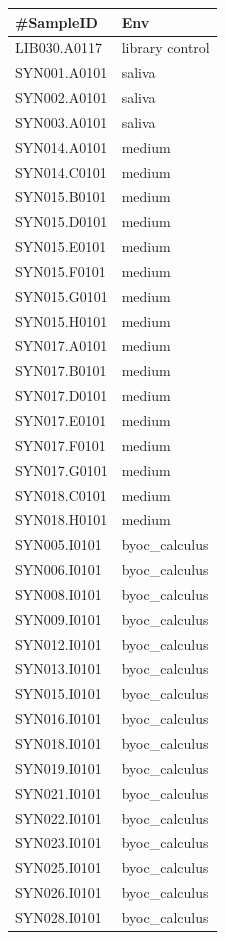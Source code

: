 \documentclass[
]{article}
\begin{document}
\begin{longtable}[]{@{}ll@{}}
\toprule()
\#SampleID & Env \\
\midrule()
\endhead
LIB030.A0117 & library control \\
SYN001.A0101 & saliva \\
SYN002.A0101 & saliva \\
SYN003.A0101 & saliva \\
SYN014.A0101 & medium \\
SYN014.C0101 & medium \\
SYN015.B0101 & medium \\
SYN015.D0101 & medium \\
SYN015.E0101 & medium \\
SYN015.F0101 & medium \\
SYN015.G0101 & medium \\
SYN015.H0101 & medium \\
SYN017.A0101 & medium \\
SYN017.B0101 & medium \\
SYN017.D0101 & medium \\
SYN017.E0101 & medium \\
SYN017.F0101 & medium \\
SYN017.G0101 & medium \\
SYN018.C0101 & medium \\
SYN018.H0101 & medium \\
SYN005.I0101 & byoc\_calculus \\
SYN006.I0101 & byoc\_calculus \\
SYN008.I0101 & byoc\_calculus \\
SYN009.I0101 & byoc\_calculus \\
SYN012.I0101 & byoc\_calculus \\
SYN013.I0101 & byoc\_calculus \\
SYN015.I0101 & byoc\_calculus \\
SYN016.I0101 & byoc\_calculus \\
SYN018.I0101 & byoc\_calculus \\
SYN019.I0101 & byoc\_calculus \\
SYN021.I0101 & byoc\_calculus \\
SYN022.I0101 & byoc\_calculus \\
SYN023.I0101 & byoc\_calculus \\
SYN025.I0101 & byoc\_calculus \\
SYN026.I0101 & byoc\_calculus \\
SYN028.I0101 & byoc\_calculus \\
\bottomrule()
\end{longtable}
\end{document}
